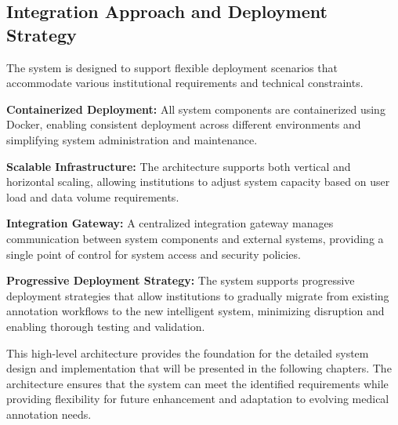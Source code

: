 \subsection{Integration Approach and Deployment Strategy}

The system is designed to support flexible deployment scenarios that accommodate various institutional requirements and technical constraints.

\textbf{Containerized Deployment:} All system components are containerized using Docker, enabling consistent deployment across different environments and simplifying system administration and maintenance.

\textbf{Scalable Infrastructure:} The architecture supports both vertical and horizontal scaling, allowing institutions to adjust system capacity based on user load and data volume requirements.

\textbf{Integration Gateway:} A centralized integration gateway manages communication between system components and external systems, providing a single point of control for system access and security policies.

\textbf{Progressive Deployment Strategy:} The system supports progressive deployment strategies that allow institutions to gradually migrate from existing annotation workflows to the new intelligent system, minimizing disruption and enabling thorough testing and validation.

This high-level architecture provides the foundation for the detailed system design and implementation that will be presented in the following chapters. The architecture ensures that the system can meet the identified requirements while providing flexibility for future enhancement and adaptation to evolving medical annotation needs. 